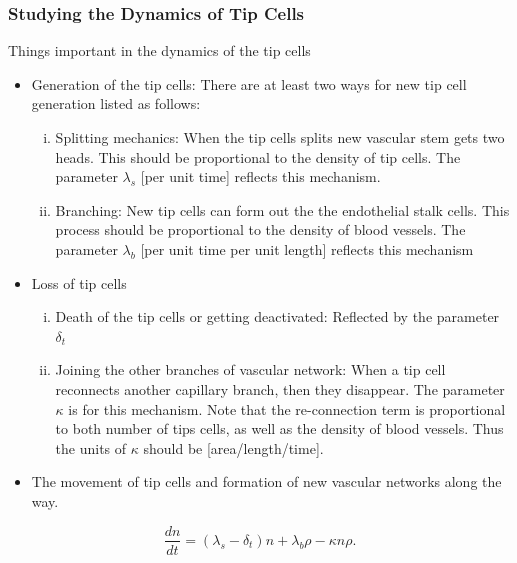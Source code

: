 \subsubsection*{Studying the Dynamics of Tip Cells}
Things important in the dynamics of the tip cells
\begin{itemize}
	\item Generation of the tip cells: There are at least two ways for new tip cell generation listed as follows:
	\begin{enumerate}[(i)]
		\item Splitting mechanics: When the tip cells splits new vascular stem gets two heads. This should be proportional to the density of tip cells. The parameter $\lambda_s$ [per unit time] reflects this mechanism.
		\item Branching: New tip cells can form out the the endothelial stalk cells. This process should be proportional to the density of blood vessels. The parameter $\lambda_b$ [per unit time per unit length] reflects this mechanism
	\end{enumerate}
	\item Loss of tip cells
	\begin{enumerate}[(i)]
		\item Death of the tip cells or getting deactivated: Reflected by the parameter $\delta_t$
		\item Joining the other branches of vascular network: When a tip cell reconnects another capillary branch, then they disappear. The parameter $\kappa$ is for this mechanism. Note that the re-connection term is proportional to both number of tips cells, as well as the density of blood vessels. Thus the units of $\kappa$ should be [area/length/time]. 
	\end{enumerate}
	\item The movement of tip cells and formation of new vascular networks along the way.
\end{itemize}

\[ \boxed{\frac{dn}{dt} = (\lambda_s - \delta_t) n + \lambda_b \rho - \kappa n \rho}.  \]

